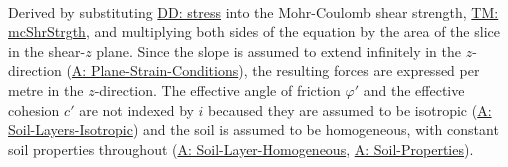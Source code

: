 \documentclass[12pt]{article}
\begin{document}
\paragraph{}
\label{GD:resShrDeriv}
Derived by substituting \hyperref[DD:stress]{DD: stress} into the Mohr-Coulomb shear strength, \hyperref[TM:mcShrStrgth]{TM: mcShrStrgth}, and multiplying both sides of the equation by the area of the slice in the shear-$z$ plane. Since the slope is assumed to extend infinitely in the $z$-direction (\hyperref[assumpPSC]{A: Plane-Strain-Conditions}), the resulting forces are expressed per metre in the $z$-direction. The effective angle of friction $φ'$ and the effective cohesion $c'$ are not indexed by $i$ becaused they are assumed to be isotropic (\hyperref[assumpSLI]{A: Soil-Layers-Isotropic}) and the soil is assumed to be homogeneous, with constant soil properties throughout (\hyperref[assumpSLH]{A: Soil-Layer-Homogeneous}, \hyperref[assumpSP]{A: Soil-Properties}).
\end{document}
